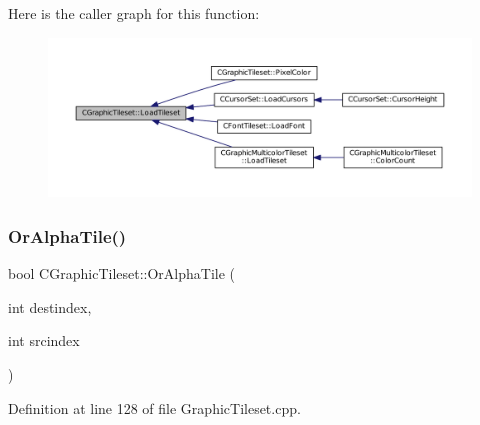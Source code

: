 Here is the caller graph for this function\+:\nopagebreak
\begin{figure}[H]
\begin{center}
\leavevmode
\includegraphics[width=350pt]{classCGraphicTileset_a7d47754f26f03958be28a064f54eef1d_icgraph}
\end{center}
\end{figure}
\hypertarget{classCGraphicTileset_ae456fe77a33c9954b6a22133f5843a15}{}\label{classCGraphicTileset_ae456fe77a33c9954b6a22133f5843a15} 
\subsubsection{\texorpdfstring{Or\+Alpha\+Tile()}{OrAlphaTile()}}
{\footnotesize\ttfamily bool C\+Graphic\+Tileset\+::\+Or\+Alpha\+Tile (\begin{DoxyParamCaption}\item[{int}]{destindex,  }\item[{int}]{srcindex }\end{DoxyParamCaption})}



Definition at line 128 of file Graphic\+Tileset.\+cpp.


